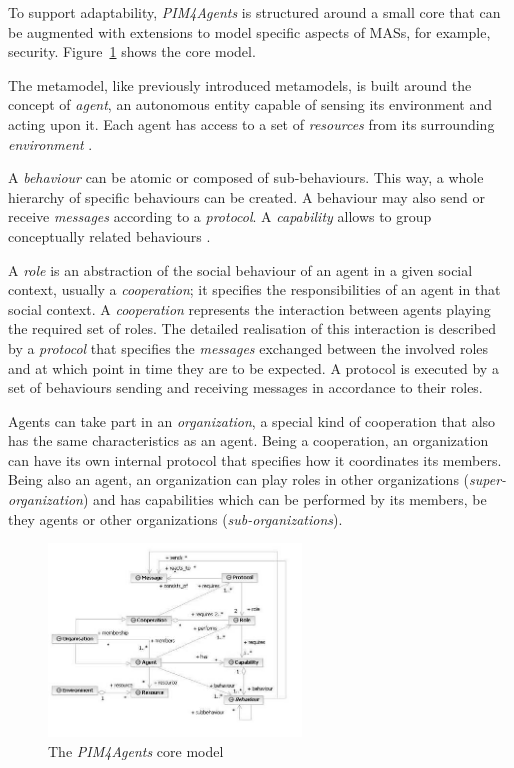 To support adaptability, \textit{PIM4Agents} is structured around a small core that can be augmented with extensions to model specific aspects of MASs, for example, security.
Figure~\ref{figure:pim4agents-metamodel} shows the core model.

The metamodel, like previously introduced metamodels, is built around the concept of \textit{agent}, an autonomous entity capable of sensing its environment and acting upon it.
Each agent has access to a set of \textit{resources} from its surrounding \textit{environment} \cite{Hahn07b}.

A \textit{behaviour} can be atomic or composed of sub-behaviours.
This way, a whole hierarchy of specific behaviours can be created.
A behaviour may also send or receive \textit{messages} according to a \textit{protocol}.
A \textit{capability} allows to group conceptually related behaviours \cite{Hahn07b}.

A \textit{role} is an abstraction of the social behaviour of an agent in a given social context, usually a \textit{cooperation}; it specifies the responsibilities of an agent in that social context.
A \textit{cooperation} represents the interaction between agents playing the required set of roles.
The detailed realisation of this interaction is described by a \textit{protocol} that specifies the \textit{messages} exchanged between the involved roles and at which point in time they are to be expected.
A protocol is executed by a set of behaviours sending and receiving messages in accordance to their roles.

Agents can take part in an \textit{organization}, a special kind of cooperation that also has the same characteristics as an agent.
Being a cooperation, an organization can have its own internal protocol that specifies how it coordinates its members.
Being also an agent, an organization can play roles in other organizations (\textit{super-organization}) and has capabilities which can be performed by its members, be they agents or other organizations (\textit{sub-organizations}).

\begin{figure}[ht]
	\centering
	\includegraphics[width=0.6\textwidth]{images/pim4agents/pim4agents-metamodel}
	\caption{The \textit{PIM4Agents} core model \cite{Hahn07b}}
	\label{figure:pim4agents-metamodel}
\end{figure}

